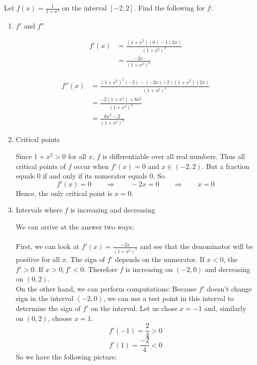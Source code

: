 \documentclass[nooutcomes,handout]{ximera}
\begin{document}
\begin{problem}
\begin{enumerate}
	\end{enumerate}
	
\end{problem}


\begin{problem}
Let $f(x) = \frac{1}{1 + x^2}$ on the interval $[-2,2]$.  Find the following for $f$:

	\begin{enumerate}
	\item  $f'$ and $f''$
	
		\begin{freeResponse}
			\begin{align*}
			f'(x) &= \frac{(1+x^2)(0) - 1(2x)}{(1+x^2)^2} \\
			&= \frac{-2x}{(1+x^2)^2}
			\end{align*}
			
			\begin{align*}
			f''(x) &= \frac{(1+x^2)^2(-2) - (-2x)(2)(1+x^2)(2x)}{(1+x^2)^4} \\
			&= \frac{-2(1+x^2) + 8x^2}{(1+x^2)^3} \\
			&= \frac{6x^2 - 2}{(1+x^2)^3}
			\end{align*}
		\end{freeResponse}
	\item  Critical points
	
		\begin{freeResponse}
		Since $1+x^2 > 0$ for all $x$, $f$ is differentiable over all real numbers.  Thus all critical points of $f$ occur when $f'(x) = 0$ and $x \in (-2,2)$.  But a fraction equals 0 if and only if its numerator equals 0.  So
		$$ f'(x) = 0 \qquad \Longrightarrow \qquad -2x = 0 \qquad \Longrightarrow \qquad x=0 $$
		Hence, the only critical point is $x=0$.  
		\end{freeResponse}
	\item  Intervals where $f$ is increasing and decreasing
	
		\begin{freeResponse}
		We can arrive at the answer two ways: \\\\	
		First, we can look at $f'(x)= \frac{-2x}{(1+x^2)^2}$ and see that the denominator will be positive for all $x$.  The sign of $f'$ depends on the numerator.  If $x<0$, the $f'>0$.  If $x>0, f'<0$.   Therefore $f$ is increasing on $(-2,0)$ and decreasing on $(0,2)$.  \\
		
		On the other hand, we can perform computations: 
		Because $f'$ doesn’t change sign in the interval $(-2,0)$, we can use a test point in this interval to determine the sign of $f'$ on the interval.  Let us chose $x=-1$ and, similarly on $(0,2)$, choose $x=1$.
		$$ f'(-1) = \frac{2}{4} > 0 $$
		$$ f'(1) = \frac{-2}{4} < 0 $$
		So we have the following picture:
		

\end{freeResponse}
\end{enumerate}
\end{problem}
\end{document}
